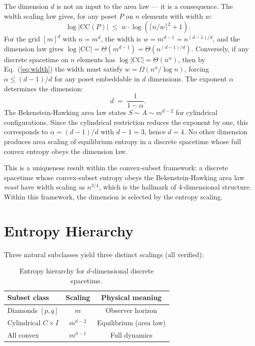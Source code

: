 \documentclass[aps,prl,twocolumn,superscriptaddress]{revtex4-2}
\begin{document}
The dimension $d$ is not an input to the area law --- it is a
consequence. The width scaling law \cite{DiFiorePaper1} gives, for any
poset $P$ on $n$ elements with width $w$:
\begin{equation}
\label{eq:width}
\log|\mathrm{CC}(P)| \;\leq\; w \cdot \log(\lceil n/w \rceil^2 + 1).
\end{equation}
For the grid $[m]^d$ with $n = m^d$, the width is
$w = m^{d-1} = n^{(d-1)/d}$, and the dimension law gives
$\log|\mathrm{CC}| = \Theta(m^{d-1}) = \Theta(n^{(d-1)/d})$.
Conversely, if any discrete spacetime on $n$ elements has
$\log|\mathrm{CC}| = \Theta(n^{\alpha})$, then by
Eq.~(\ref{eq:width}) the width must satisfy
$w = \Omega(n^{\alpha}/\log n)$, forcing $\alpha \leq (d-1)/d$ for
any poset embeddable in $d$ dimensions. The exponent $\alpha$
determines the dimension:
\begin{equation}
d \;=\; \frac{1}{1 - \alpha}.
\end{equation}
The Bekenstein-Hawking area law states $S \sim A \sim m^{d-2}$ for
cylindrical configurations. Since the cylindrical restriction reduces
the exponent by one, this corresponds to
$\alpha = (d-1)/d$ with $d-1 = 3$, hence $d = 4$. No other
dimension produces area scaling of equilibrium entropy in a discrete
spacetime whose full convex entropy obeys the dimension law.

This is a uniqueness result within the convex-subset framework:
a discrete spacetime whose
convex-subset entropy obeys the Bekenstein-Hawking area law
\emph{must} have width scaling as $n^{3/4}$, which is the hallmark
of 4-dimensional structure. Within this framework, the dimension is
selected by the entropy scaling.

\section{Entropy Hierarchy}

Three natural subclasses yield three distinct scalings (all verified):

\begin{table}[h]
\caption{Entropy hierarchy for $d$-dimensional discrete spacetime.}
\label{tab:hierarchy}
\begin{ruledtabular}
\begin{tabular}{lcc}
Subset class & Scaling & Physical meaning \\
\midrule
Diamonds $[p,q]$ & $m$ & Observer horizon \\
Cylindrical $C \times I$ & $m^{d-2}$ & Equilibrium (area law) \\
All convex & $m^{d-1}$ & Full dynamics \\
\end{tabular}
\end{ruledtabular}
\end{table}
\end{document}

